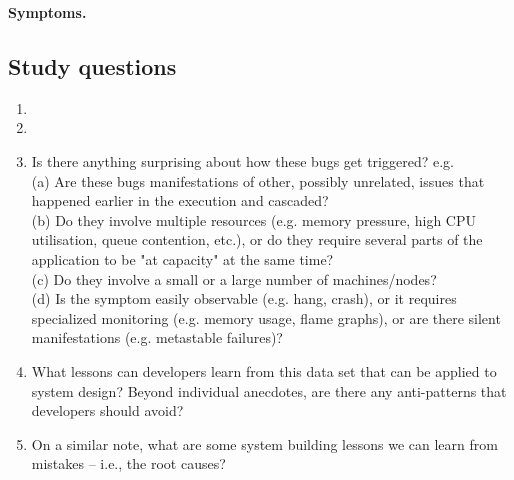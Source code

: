 \vspace{.05in}
\noindent
\textbf{Symptoms.}


\subsection{Study questions}

\begin{enumerate}
    \item {}
    \item {}
    \item Is there anything surprising about how these bugs get triggered? e.g. 
    \\ (a) Are these bugs manifestations of other, possibly unrelated, issues that 
    happened earlier in the execution and cascaded? 
    \\ (b) Do they involve multiple resources (e.g. memory pressure, high CPU utilisation, queue contention, etc.), 
    or do they require several parts of the application to be "at capacity" at the same time? 
    \\ (c) Do they involve a small or a large number of machines/nodes? 
    \\ (d) Is the symptom easily observable (e.g. hang, crash), or it requires specialized monitoring 
  (e.g. memory usage, flame graphs), or are there silent manifestations (e.g. metastable failures)?  
    \\ 
    \item What lessons can developers learn from this data set that can be applied to system design? Beyond
    individual anecdotes, are there any anti-patterns that developers should avoid?
    \item On a similar note, what are some system building lessons we can learn from mistakes -- i.e., the root causes?
    \\ 

\end{enumerate}
